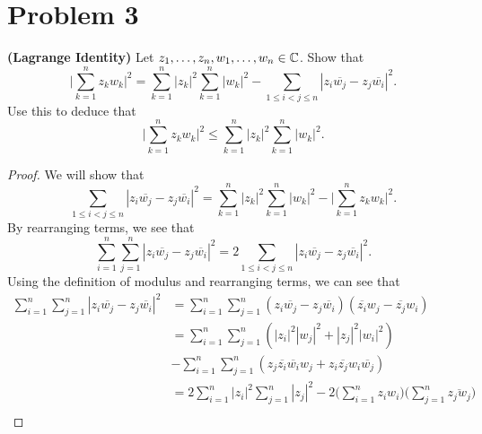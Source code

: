 \documentclass[a4paper]{article}
\begin{document}
    \section*{Problem 3} \textbf{(Lagrange Identity)} Let \( {z}_{1}, \dots, {z}_{n}, {w}_{1}, \dots, {w}_{n} \in \mathbb{C}   \). Show that    
        \[  \Big| \sum_{ k=1  }^{ n } {z}_{k} {w}_{k} \Big|^{2} = \sum_{ k=1  }^{ n } | {z}_{k} |^{2} \sum_{ k=1  }^{ n } | {w}_{k } |^{2} - \sum_{ 1 \leq i < j \leq n  }^{  } | {z}_{i} \overline{{w}_{j}} - {z}_{j} \overline{{w}_{i}} |^{2}. \]
        Use this to deduce that 
        \[  \Big| \sum_{ k=1  }^{ n } {z}_{k } {w}_{k } \Big|^{2} \leq \sum_{ k=1  }^{ n } | {z}_{k} |^{2} \sum_{ k=1  }^{ n } | {w}_{k } |^{2}. \]
        \begin{proof}
        We will show that 
        \[  \sum_{ 1 \leq i < j \leq n  }^{  } | {z}_{i} \overline{{w}_{j}} - {z}_{j} \overline{{w}_{i}} |^{2} = \sum_{ k=1  }^{ n } | {z}_{k } |^{2} \sum_{ k=1  }^{ n } | {w}_{k } |^{2} - \Big|  \sum_{ k=1  }^{ n } {z}_{k } {w}_{k } \Big|^{2}. \]
        By rearranging terms, we see that 
        \[  \sum_{ i=1  }^{ n  } \sum_{ j=1  }^{ n } | {z}_{i} \overline{{w}_{j}} - {z}_{j} \overline{{w}_{i}} |^{2} = 2 \sum_{ 1 \leq  i < j \leq n  }^{  } | {z}_{i} \overline{{w}_{j}} - {z}_{j} \overline{{w}_{i}} |^{2}. \tag{1} \]
        Using the definition of modulus and rearranging terms, we can see that 
        \begin{align*}
            \sum_{ i=1  }^{ n } \sum_{ j=1  }^{ n } | {z}_{i} \overline{{w}_{j}} - {z}_{j} \overline{{w}_{i}} |^{2} &= \sum_{ i=1  }^{ n } \sum_{ j=1  }^{ n } ({z}_{i} \overline{{w}_{j}} - {z}_{j} \overline{{w}_{i}})(\overline{{z}_{i}} {w}_{j} - \overline{{z}_{j}} {w}_{i}) \\
                                                                                                                    &= \sum_{ i=1  }^{ n } \sum_{ j=1  }^{ n } (| {z}_{i} |^{2} | {w}_{j} |^{2} + | {z}_{j} |^{2} | {w}_{i} |^{2}) \\
                                                                                                                    &- \sum_{ i=1  }^{ n } \sum_{ j=1  }^{ n } ({z}_{j} \overline{{z}_{i}} \overline{{w}_{i}} {w}_{j} + {z}_{i} \overline{{z}_{j}} {w}_{i} \overline{{w}_{j}}) \\
                                                                                                                    &= 2 \sum_{ i=1  }^{ n } | {z}_{i} |^{2} \sum_{ j=1  }^{ n } | {z}_{j} |^{2} - 2 \Big( \sum_{ i=1  }^{ n } {z}_{i} {w}_{i} \Big) \Big(  \sum_{ j=1  }^{ n } \overline{{z}_{j} {w}_{j}} \Big) \\

\end{align*}
\end{proof}
\end{document}
